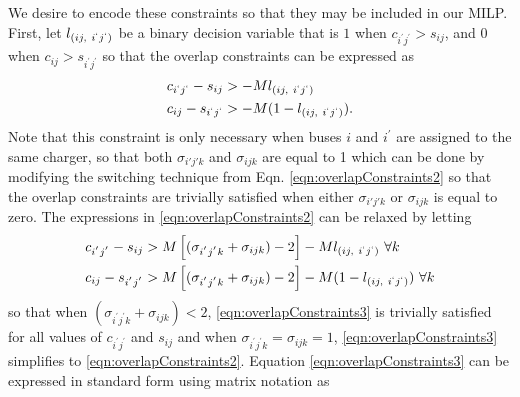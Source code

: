 
We desire to encode these constraints so that they may be included in our MILP. First, let $l_{\left( ij, \ i^{`}j^{`}\right )}$ be a binary decision variable that is $1$ when $c_{i^{'}j^{'}} > s_{ij}$, and $0$ when $c_{ij} > s_{i^{'}j^{'}}$ so that the overlap constraints can be expressed as 
	\begin{equation} \label{eqn:overlapConstraints2}\begin{aligned}
	c_{i^{`}j^{`}} - s_{ij}  &> -Ml_{\left( ij, \ i^{`}j^{`}\right )} \\
	c_{ij}-s_{i^{`}j^{`}} &>  -M(1 - l_{\left( ij, \ i^{`}j^{`}\right )}). 
\end{aligned}\end{equation}
	Note that this constraint is only necessary when buses $i$ and $i^{'}$ are assigned to the same charger, so that both $\sigma_{i'j'k}$ and $\sigma_{ijk}$ are equal to 1 which can be done by modifying the switching technique from Eqn. \eqref{eqn:overlapConstraints2} so that the overlap constraints are trivially satisfied when either $\sigma_{i'j'k}$ or $\sigma_{ijk}$ is equal to zero. The expressions in \eqref{eqn:overlapConstraints2} can be relaxed by letting 
\begin{equation}\label{eqn:overlapConstraints3}\begin{aligned}
	c_{i^{'}j^{'}} - s_{ij} &> M\left[(\sigma_{i^{'}j^{'}k} + \sigma_{ijk}) - 2\right] - Ml_{\left( ij, \ i^{`}j^{`}\right )} \ \forall k \\
	c_{ij} - s_{i^{'}j^{'}} &> M\left[(\sigma_{i^{'}j^{'}k} + \sigma_{ijk}) - 2\right] - M(1 - l_{\left( ij, \ i^{`}j^{`}\right )})\ \forall k \\
\end{aligned}\end{equation}
so that when $(\sigma_{i^{'}j^{'}k} + \sigma_{ijk}) < 2$, \eqref{eqn:overlapConstraints3} is trivially satisfied for all values of $c_{i^{'}j^{'}}$ and $s_{ij}$ and when $\sigma_{i^{'}j^{'}k} = \sigma_{ijk} = 1$, \eqref{eqn:overlapConstraints3} simplifies to \eqref{eqn:overlapConstraints2}. Equation \eqref{eqn:overlapConstraints3} can be expressed in standard form using matrix notation as 
